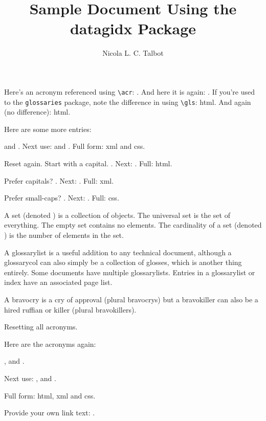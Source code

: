 \documentclass{article}
\title{Sample Document Using the datagidx Package}
\author{Nicola L. C. Talbot}
\begin{document}
\maketitle

Here's an acronym referenced using \verb|\acr|: .
And here
it is again: . If you're used to the \texttt{glossaries}
package, note the difference in using \verb|\gls|: \gls{html}.
And again (no difference): \gls{html}.

Here are some more entries:

 and .
Next use:
 and .
Full form:
\gls{xml} and \gls{css}.

Reset again. %
Start with a capital. .
Next: . Full: \Gls{html}.

Prefer capitals?
\renewcommand{\acronymfont}[1]{\MakeTextUppercase{#1}}%
. Next: . Full: \gls{xml}.

Prefer small-caps?
\renewcommand{\acronymfont}[1]{\textsc{#1}}%
. Next: . Full: \gls{css}.

A \gls{set} (denoted ) is a collection of objects.
The \gls{universal set} is the set of everything.
The \gls{empty set} contains no elements.
The \gls{cardinality} of a set (denoted ) is the
number of elements in the set.

A \gls{glossarylist} is a useful
addition to any technical document,
although a \gls{glossarycol} can also simply be a collection of
glosses, which is another thing entirely. Some documents have
multiple \glspl{glossarylist}. Entries in a \gls{glossarylist} or 
\gls{index} have an associated \gls{page list}. 

A \gls{bravocry} is a cry of approval (plural \glspl{bravocry}) but
a
\gls{bravokiller} can also be a hired ruffian or killer (plural
\glspl{bravokiller}).

\newpage

Resetting all acronyms.

Here are the acronyms again:

,  and .

Next use:
,  and .

Full form:
\Gls{html}, \gls{xml} and \gls{css}.

\newpage

Provide your own link text: .
\end{document}
